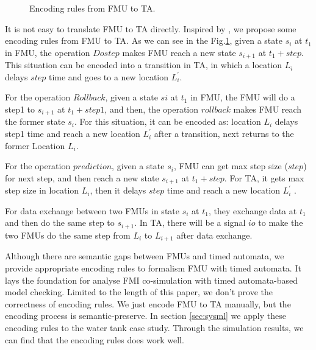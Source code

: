 \begin{figure}[htbp]
	\caption{Encoding rules from FMU to TA.}
	\label{fmutota}
\end{figure}

It is not easy to translate FMU to TA directly. Inspired by \cite{Tripakis15}, we propose some encoding rules from FMU to TA. As we can see in the Fig.\ref{fmutota}, given a state $s_{i}$ at $t_{1}$ in FMU, the operation $Dostep$ makes FMU reach a new state $s_{i+1}$ at $t_{1}+step$. This situation can be encoded into a transition in TA, in which a location $L_{i}$ delays $step$ time and goes to a new location $L_{i}^{\prime}$.

For the operation $Rollback$, given a state $s{i}$ at $t_{1}$ in FMU, the FMU will do a step1 to $s_{i+1}$ at $t_{1}+step1$, and then, the operation $rollback$ makes FMU reach the former state $s_{i}$. For this situation, it can be encoded as: location $L_{i}$ delays step1 time and reach a new location $L_{i}^{\prime}$ after a transition, next returns to the former Location $L_{i}$. 

For the operation $prediction$, given a state $s_{i}$, FMU can get max step size ($step$) for next step, and then reach a new state $s_{i+1}$ at $t_{1}+step$. For TA, it gets max step size in location $L_{i}$, then it delays $step$ time and reach a new location $L_{i}^{\prime}$ .

For data exchange between two FMUs in state $s_{i}$ at $t_{1}$, they exchange data at $t_{1}$ and then do the same step to $s_{i+1}$. In TA, there will be a signal $io$ to make the two FMUs do the same step from $L_{i}$ to $L_{i+1}$ after data exchange.

Although there are semantic gaps between FMUs and timed automata, we provide appropriate encoding rules to formalism FMU with timed automata. It lays the foundation for analyse FMI co-simulation with timed automata-based model checking. Limited to the length of this paper, we don't prove the correctness of encoding rules. We just encode FMU to TA manually, but the encoding process is semantic-preserve. In section \ref{sec:sysml} we apply these encoding rules to the water tank case study. Through the simulation results, we can find that the encoding rules does work well.